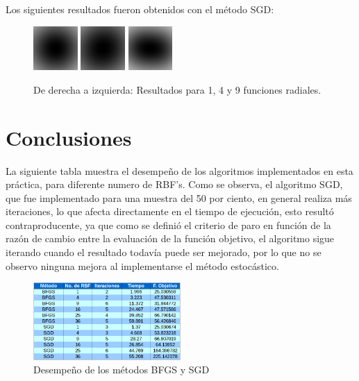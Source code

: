 \documentclass[10pt,journal,compsoc]{styles/IEEEtran}
\begin{document}
Los siguientes resultados fueron obtenidos con el método SGD:\\

\begin{figure}[H]
	\centering
	\includegraphics[width=0.15\textwidth]{SGD1.png}
	\includegraphics[width=0.15\textwidth]{SGD2.png}
	\includegraphics[width=0.15\textwidth]{SGD3.png}
	
	\caption{De derecha a izquierda: Resultados para 1, 4 y 9 funciones radiales.}
\end{figure}

\section{Conclusiones}

La siguiente tabla muestra el desempeño de los algoritmos implementados en esta pr\'actica, para diferente numero de RBF's. Como se observa, el algoritmo SGD, que fue implementado para una muestra del 50 por ciento, en general realiza m\'as iteraciones, lo que afecta directamente en el tiempo de ejecución, esto result\'o contraproducente, ya que como se definió el criterio de paro en función de la razón de cambio entre la evaluación de la función objetivo, el algoritmo sigue iterando cuando el resultado todavía puede ser mejorado, por lo que no se observo ninguna mejora al implementarse el método estocástico.

\begin{figure}[H]
\centering
\includegraphics[width=0.5\textwidth]{tabla.png}
\caption{Desempeño de los métodos BFGS y SGD}
\end{figure}


\end{document}
